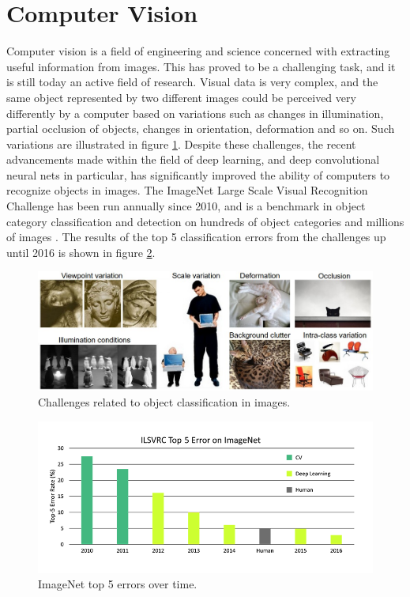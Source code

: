 \section{Computer Vision}
Computer vision is a field of engineering and science concerned with extracting useful information from images. This has proved to be a challenging task, and it is still today an active field of research. Visual data is very complex, and the same object represented by two different images could be perceived very differently by a computer based on variations such as changes in illumination, partial occlusion of objects, changes in orientation, deformation and so on. Such variations are illustrated in figure \ref{fig:cv_challenges}. Despite these challenges, the recent advancements made within the field of deep learning, and deep convolutional neural nets in particular, has significantly improved the ability of computers to recognize objects in images. The ImageNet Large Scale Visual Recognition Challenge has been run annually since 2010, and is a benchmark in object category classification and detection on hundreds of object categories and millions of images \cite{ILSVRC15}. The results of the top 5 classification errors from the challenges up until 2016 is shown in figure \ref{fig:imagenet_top_5}. 
\begin{figure}[H]
    \centering
    \includegraphics[width=.8\linewidth]{fig/challenges.jpeg}
    \caption{Challenges related to object classification in images.\protect\footnotemark}
    \label{fig:cv_challenges}
\end{figure}
\begin{figure}[H]
    \centering
    \includegraphics[width=.8\linewidth]{fig/imagenet_top_5.png}
    \caption{ImageNet top 5 errors over time.\protect\footnotemark}
    \label{fig:imagenet_top_5}
\end{figure}
